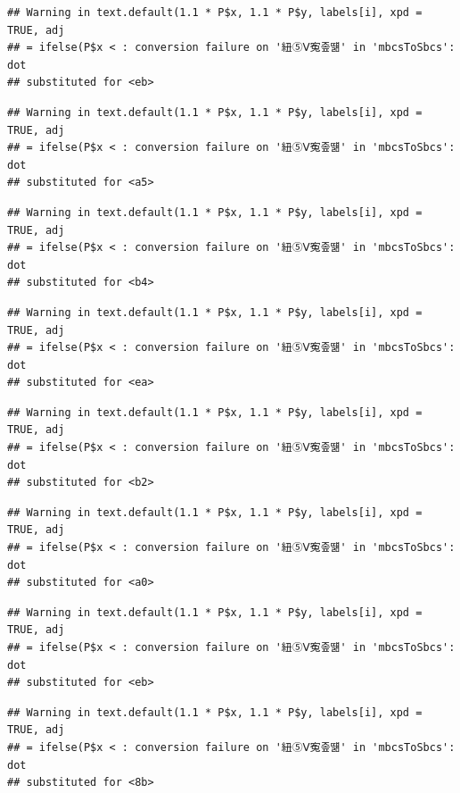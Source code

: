 \documentclass[
]{article}
\begin{document}
\begin{verbatim}
## Warning in text.default(1.1 * P$x, 1.1 * P$y, labels[i], xpd = TRUE, adj
## = ifelse(P$x < : conversion failure on '紐⑤Ⅴ寃좊떎' in 'mbcsToSbcs': dot
## substituted for <eb>
\end{verbatim}

\begin{verbatim}
## Warning in text.default(1.1 * P$x, 1.1 * P$y, labels[i], xpd = TRUE, adj
## = ifelse(P$x < : conversion failure on '紐⑤Ⅴ寃좊떎' in 'mbcsToSbcs': dot
## substituted for <a5>
\end{verbatim}

\begin{verbatim}
## Warning in text.default(1.1 * P$x, 1.1 * P$y, labels[i], xpd = TRUE, adj
## = ifelse(P$x < : conversion failure on '紐⑤Ⅴ寃좊떎' in 'mbcsToSbcs': dot
## substituted for <b4>
\end{verbatim}

\begin{verbatim}
## Warning in text.default(1.1 * P$x, 1.1 * P$y, labels[i], xpd = TRUE, adj
## = ifelse(P$x < : conversion failure on '紐⑤Ⅴ寃좊떎' in 'mbcsToSbcs': dot
## substituted for <ea>
\end{verbatim}

\begin{verbatim}
## Warning in text.default(1.1 * P$x, 1.1 * P$y, labels[i], xpd = TRUE, adj
## = ifelse(P$x < : conversion failure on '紐⑤Ⅴ寃좊떎' in 'mbcsToSbcs': dot
## substituted for <b2>
\end{verbatim}

\begin{verbatim}
## Warning in text.default(1.1 * P$x, 1.1 * P$y, labels[i], xpd = TRUE, adj
## = ifelse(P$x < : conversion failure on '紐⑤Ⅴ寃좊떎' in 'mbcsToSbcs': dot
## substituted for <a0>
\end{verbatim}

\begin{verbatim}
## Warning in text.default(1.1 * P$x, 1.1 * P$y, labels[i], xpd = TRUE, adj
## = ifelse(P$x < : conversion failure on '紐⑤Ⅴ寃좊떎' in 'mbcsToSbcs': dot
## substituted for <eb>
\end{verbatim}

\begin{verbatim}
## Warning in text.default(1.1 * P$x, 1.1 * P$y, labels[i], xpd = TRUE, adj
## = ifelse(P$x < : conversion failure on '紐⑤Ⅴ寃좊떎' in 'mbcsToSbcs': dot
## substituted for <8b>
\end{verbatim}
\end{document}

